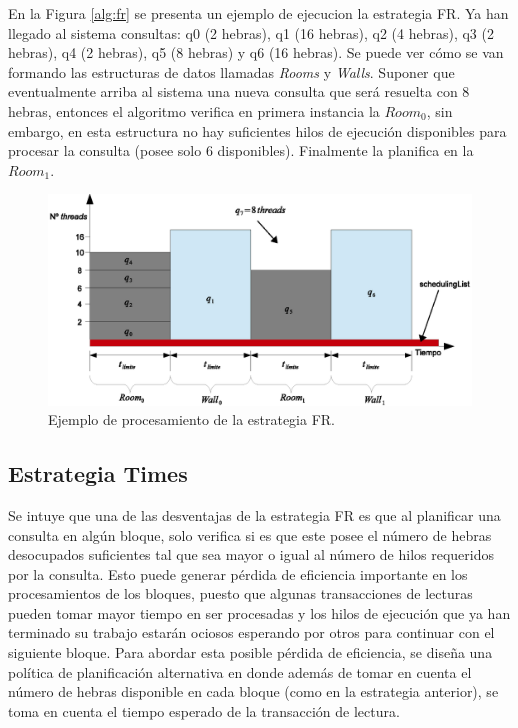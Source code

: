 En la Figura \ref{alg:fr} se presenta un ejemplo de ejecucion la estrategia FR. Ya han llegado al sistema consultas: q0 (2 hebras), q1 (16 hebras), q2 (4 hebras), q3 (2 hebras), q4 (2 hebras), q5 (8 hebras) y q6 (16 hebras). Se puede ver cómo se van formando las estructuras de datos llamadas \textit{Rooms} y \textit{Walls}. Suponer que eventualmente arriba al sistema una nueva consulta que será resuelta con 8 hebras, entonces el algoritmo verifica en primera instancia la $Room_0$, sin embargo, en esta estructura no hay suficientes hilos de ejecución disponibles para procesar la consulta (posee solo 6 disponibles). Finalmente la planifica en la $Room_1$.

\begin{figure}[!th]
\centering
\includegraphics[scale=.75]{images/proceso_FR.eps}
\caption{Ejemplo de procesamiento de la estrategia FR.}
\label{fig:proceso_FR}
\end{figure} 

\subsection{Estrategia Times}
\label{scheduling:times}
Se intuye que una de las desventajas de la estrategia FR es que al planificar una consulta en algún bloque, solo verifica si es que este posee el número de hebras desocupados suficientes tal que sea mayor o igual al número de hilos requeridos por la consulta. Esto puede generar pérdida de eficiencia importante en los procesamientos de los bloques, puesto que algunas transacciones de lecturas pueden tomar mayor tiempo en ser procesadas y los hilos de ejecución que ya han terminado su trabajo estarán ociosos esperando por otros para continuar con el siguiente bloque. Para abordar esta posible pérdida de eficiencia, se diseña una política de planificación alternativa en donde además de tomar en cuenta el número de hebras disponible en cada bloque (como en la estrategia anterior), se toma en cuenta el tiempo esperado de la transacción de lectura.

